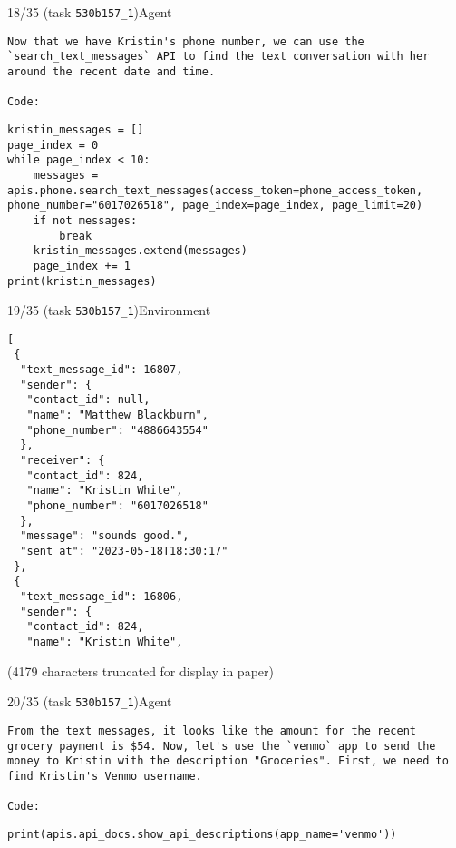 \begin{minipage}{0.95\linewidth}
\begin{assistant_message_box}{{18/35 (task \texttt{530b157\_1})\hfill Agent}}
\scriptsize
\begin{Verbatim}[breaklines]
Now that we have Kristin's phone number, we can use the `search_text_messages` API to find the text conversation with her around the recent date and time.

Code:
\end{Verbatim}
\begin{tcolorbox}[colback=codebgcolor,boxrule=0pt]\begin{Verbatim}[breaklines]
kristin_messages = []
page_index = 0
while page_index < 10:
    messages = apis.phone.search_text_messages(access_token=phone_access_token, phone_number="6017026518", page_index=page_index, page_limit=20)
    if not messages:
        break
    kristin_messages.extend(messages)
    page_index += 1
print(kristin_messages)
\end{Verbatim}
\end{tcolorbox}\end{assistant_message_box}
\end{minipage}

\hspace*{8mm}%
\begin{minipage}{0.95\linewidth}
\begin{user_message_box}{{19/35 (task \texttt{530b157\_1})\hfill Environment}}
\scriptsize
\begin{Verbatim}[breaklines]
[
 {
  "text_message_id": 16807,
  "sender": {
   "contact_id": null,
   "name": "Matthew Blackburn",
   "phone_number": "4886643554"
  },
  "receiver": {
   "contact_id": 824,
   "name": "Kristin White",
   "phone_number": "6017026518"
  },
  "message": "sounds good.",
  "sent_at": "2023-05-18T18:30:17"
 },
 {
  "text_message_id": 16806,
  "sender": {
   "contact_id": 824,
   "name": "Kristin White",
\end{Verbatim}
(4179 characters truncated for display in paper)\end{user_message_box}
\end{minipage}

\begin{minipage}{0.95\linewidth}
\begin{assistant_message_box}{{20/35 (task \texttt{530b157\_1})\hfill Agent}}
\scriptsize
\begin{Verbatim}[breaklines]
From the text messages, it looks like the amount for the recent grocery payment is $54. Now, let's use the `venmo` app to send the money to Kristin with the description "Groceries". First, we need to find Kristin's Venmo username.

Code:
\end{Verbatim}
\begin{tcolorbox}[colback=codebgcolor,boxrule=0pt]\begin{Verbatim}[breaklines]
print(apis.api_docs.show_api_descriptions(app_name='venmo'))
\end{Verbatim}
\end{tcolorbox}\end{assistant_message_box}
\end{minipage}

